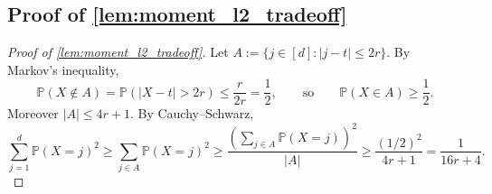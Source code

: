 \documentclass{article}
\theoremstyle{plain}
\theoremstyle{definition}
\theoremstyle{plain}
\newcommand{\PP}{\mathbb P}
\begin{document}
\subsection{Proof of \texorpdfstring{\cref{lem:moment_l2_tradeoff}}{Lemma (Moment--l2 tradeoff)}}
\label{proof:lem:moment_l2_tradeoff}
\begin{proof}[Proof of \cref{lem:moment_l2_tradeoff}]
    Let $A:=\{j\in[d]: |j-t|\le 2r\}$.
    By Markov's inequality,
    \[
        \PP(X\notin A)=\PP(|X-t|>2r)\le \frac{r}{2r}=\frac12,
        \qquad\text{so}\qquad
        \PP(X\in A)\ge \frac12.
    \]
    Moreover $|A|\le 4r+1$.
    By Cauchy--Schwarz,
    \[
        \sum_{j=1}^d \PP(X=j)^2
        \ge \sum_{j\in A}\PP(X=j)^2
        \ge \frac{\left(\sum_{j\in A}\PP(X=j)\right)^2}{|A|}
        \ge \frac{(1/2)^2}{4r+1}
        = \frac{1}{16r+4}.
    \]
\end{proof}
\end{document}

